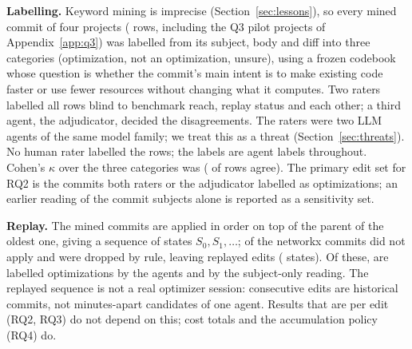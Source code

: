 \textbf{Labelling.} Keyword mining is imprecise (Section~\ref{sec:lessons}), so every mined commit of four projects (\LabelRows{} rows, including the Q3 pilot projects of Appendix~\ref{app:q3}) was labelled from its subject, body and diff into three categories (optimization, not an optimization, unsure), using a frozen codebook whose question is whether the commit's main intent is to make existing code faster or use fewer resources without changing what it computes.
Two raters labelled all rows blind to benchmark reach, replay status and each other; a third agent, the adjudicator, decided the \LabelAdjudicated{} disagreements.
The raters were two LLM agents of the same model family; we treat this as a threat (Section~\ref{sec:threats}).
No human rater labelled the rows; the labels are agent labels throughout.
Cohen's $\kappa$ over the three categories was \LabelKappa{} (\LabelAgree{} of \LabelRows{} rows agree).
The primary edit set for RQ2 is the commits both raters or the adjudicator labelled as optimizations; an earlier reading of the commit subjects alone is reported as a sensitivity set.

\textbf{Replay.} The mined commits are applied in order on top of the parent of the oldest one, giving a sequence of states $S_0, S_1, \dots$; \NxDropped{} of the \NxMined{} networkx commits did not apply and were dropped by rule, leaving \NxReplayed{} replayed edits (\NxStates{} states).
Of these, \NxAgentOpt{} are labelled optimizations by the agents and \NxManualOpt{} by the subject-only reading.
The replayed sequence is not a real optimizer session: consecutive edits are historical commits, not minutes-apart candidates of one agent.
Results that are per edit (RQ2, RQ3) do not depend on this; cost totals and the accumulation policy (RQ4) do.

